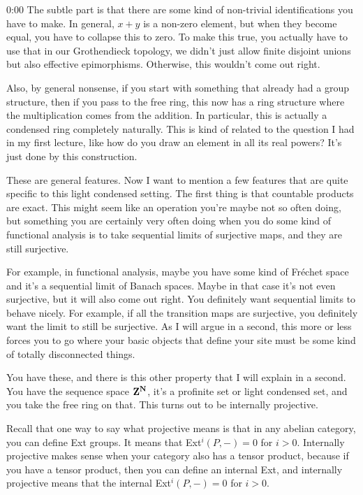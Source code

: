 \begin{unfinished}{0:00}
The subtle part is that there are some kind of non-trivial identifications you have to make. In general, $x+y$ is a non-zero element, but when they become equal, you have to collapse this to zero. To make this true, you actually have to use that in our Grothendieck topology, we didn't just allow finite disjoint unions but also effective epimorphisms. Otherwise, this wouldn't come out right.

Also, by general nonsense, if you start with something that already had a group structure, then if you pass to the free ring, this now has a ring structure where the multiplication comes from the addition. In particular, this is actually a condensed ring completely naturally. This is kind of related to the question I had in my first lecture, like how do you draw an element in all its real powers? It's just done by this construction.

These are general features. Now I want to mention a few features that are quite specific to this light condensed setting. The first thing is that countable products are exact. This might seem like an operation you're maybe not so often doing, but something you are certainly very often doing when you do some kind of functional analysis is to take sequential limits of surjective maps, and they are still surjective.

For example, in functional analysis, maybe you have some kind of Fréchet space and it's a sequential limit of Banach spaces. Maybe in that case it's not even surjective, but it will also come out right. You definitely want sequential limits to behave nicely. For example, if all the transition maps are surjective, you definitely want the limit to still be surjective. As I will argue in a second, this more or less forces you to go where your basic objects that define your site must be some kind of totally disconnected things.

You have these, and there is this other property that I will explain in a second. You have the sequence space $\mathbf Z^\mathbf N$, it's a profinite set or light condensed set, and you take the free ring on that. This turns out to be internally projective.

Recall that one way to say what projective means is that in any abelian category, you can define Ext groups. It means that Ext$^i(P,-)=0$ for $i>0$. Internally projective makes sense when your category also has a tensor product, because if you have a tensor product, then you can define an internal Ext, and internally projective means that the internal Ext$^i(P,-)=0$ for $i>0$.


\end{unfinished}
